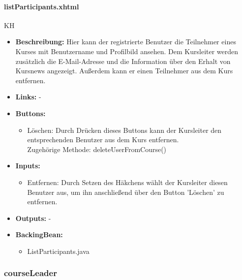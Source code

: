 				\paragraph{listParticipants.xhtml}
					KH\\
					\begin{itemize}
						\item \textbf{Beschreibung:} Hier kann der registrierte Benutzer die Teilnehmer eines Kurses mit Benutzername und Profilbild ansehen. Dem Kursleiter werden zusätzlich die E-Mail-Adresse und die Information über den Erhalt von Kursnews angezeigt. Außerdem kann er einen Teilnehmer aus dem Kurs entfernen.
						\item \textbf{Links:} -
						\item \textbf{Buttons:}
							\begin{itemize}
								\item Löschen: Durch Drücken dieses Buttons kann der Kursleiter den entsprechenden Benutzer aus dem Kurs entfernen. \\ Zugehörige Methode: deleteUserFromCourse()
							\end{itemize}
						\item \textbf{Inputs:}
							 \begin{itemize}
							 	\item Entfernen: Durch Setzen des Häkchens wählt der Kursleiter diesen Benutzer aus, um ihn anschließend über den Button 'Löschen' zu entfernen.
							 \end{itemize}
						\item \textbf{Outputs:} -
						\item \textbf{BackingBean:}
							\begin{itemize}
								\item ListParticipants.java
							\end{itemize}
					\end{itemize}
			
			\subsubsection{courseLeader}
			

